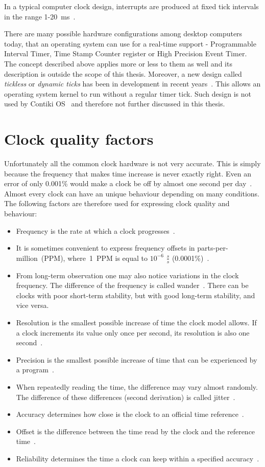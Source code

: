 In a typical computer clock design, interrupts are produced at
fixed tick intervals in the range 1-20~ms~\cite{nanokernel}.

There are many possible hardware configurations among desktop computers today,
that an operating system can use for a real-time support -
Programmable Interval Timer,
Time Stamp Counter register or High Precision Event Timer.
The concept described above applies more or less to them as well
and its description is outside the scope of this thesis.
Moreover, a new design called {\it{tickless}} or {\it{dynamic ticks}}
has been in development in recent years~\cite{kernel-timer-systems}.
This allows an operating system kernel to run without a regular timer tick.
Such design is not used by Contiki OS~\cite{contiki-docs} and
therefore not further discussed in this thesis.

\section{Clock quality factors}
Unfortunately all the common clock hardware is not very accurate.
This is simply because the frequency that makes time increase is never exactly right.
Even an error of only 0.001\% would make a clock be off by almost one second per day~\cite{ntp-faq}.
Almost every clock can have an unique behaviour depending on many conditions.
The following factors are therefore used for expressing clock quality and behaviour:
\begin{itemize}
\item
Frequency is the rate at which a clock progresses~\cite{thesis-sync}.
\item
It is sometimes convenient
to express frequency offsets in parts-per-million~(PPM), where~1~PPM
is equal to $10^{-6}$ $\frac{s}{s}$ (0.0001\%)~\cite{rfc5905}.
\item
From long-term observation one may also notice variations in the clock frequency.
The difference of the frequency is called wander~\cite{ntp-faq}.
There can be clocks with poor short-term stability, but with good long-term stability, and vice versa.
\item
Resolution is the smallest possible increase of time the clock model allows.
If a clock increments its value only once per second, its resolution is also one second~\cite{ntp-faq}.
\item
Precision is the smallest possible increase of time that can be experienced
by a program~\cite{ntp-faq}.
\item
When repeatedly reading the time, the difference may vary almost randomly.
The difference of these differences (second derivation) is called jitter~\cite{ntp-faq}.
\item
Accuracy determines how close is the clock to an official time reference~\cite{ntp-faq}.
\item
Offset is the difference between the time read by the clock and the reference time~\cite{thesis-sync}.
\item
Reliability determines the time a clock can keep within a specified accuracy~\cite{ntp-faq}.
\end{itemize}

